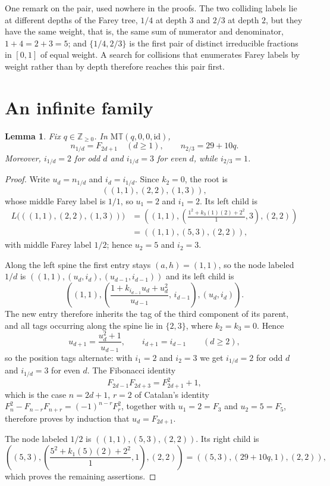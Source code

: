 \documentclass[11pt]{amsart}
\newtheorem{lemma}[theorem]{Lemma}
\newcommand{\GMT}{\mathrm{M}\mathbb{T}}
\newcommand{\id}{\mathrm{id}}
\begin{document}
One remark on the pair, used nowhere in the proofs. The two colliding labels lie
at different depths of the Farey tree, $1/4$ at depth $3$ and $2/3$ at depth
$2$, but they have the same weight, that is, the same sum of numerator and
denominator, $1+4=2+3=5$; and $\{1/4,2/3\}$ is the first pair of distinct
irreducible fractions in $[0,1]$ of equal weight. A search for collisions that
enumerates Farey labels by weight rather than by depth therefore reaches this
pair first.

\section{An infinite family}

\begin{lemma}\label{lem:spine}
Fix $q\in\mathbb Z_{\ge0}$. In $\GMT(q,0,0,\id)$,
\[
 n_{1/d}=F_{2d+1}\quad(d\ge1),
 \qquad
 n_{2/3}=29+10q.
\]
Moreover, $i_{1/d}=2$ for odd $d$ and $i_{1/d}=3$ for even $d$, while
$i_{2/3}=1$.
\end{lemma}

\begin{proof}
Write $u_d=n_{1/d}$ and $i_d=i_{1/d}$. Since $k_2=0$, the root is
\[
 ((1,1),(2,2),(1,3)),
\]
whose middle Farey label is $1/1$, so $u_1=2$ and $i_1=2$. Its left child
is
\begin{align*}
 L\bigl(((1,1),(2,2),(1,3))\bigr)
 &=\left((1,1),\left(\frac{1^2+k_3(1)(2)+2^2}{1},3\right),(2,2)\right)\\
 &=((1,1),(5,3),(2,2)),
\end{align*}
with middle Farey label $1/2$; hence $u_2=5$ and $i_2=3$.

Along the left spine the first entry stays $(a,h)=(1,1)$, so the node labeled
$1/d$ is $((1,1),(u_d,i_d),(u_{d-1},i_{d-1}))$ and its left child is
\[
 \left(
  (1,1),
  \left(\frac{1+k_{i_{d-1}}u_d+u_d^2}{u_{d-1}},\,i_{d-1}\right),
  (u_d,i_d)
 \right).
\]
The new entry therefore inherits the tag of the third component of its
parent, and all tags occurring along the spine lie in $\{2,3\}$, where
$k_2=k_3=0$. Hence
\[
 u_{d+1}=\frac{u_d^2+1}{u_{d-1}},
 \qquad
 i_{d+1}=i_{d-1}
 \qquad(d\ge2),
\]
so the position tags alternate: with $i_1=2$ and $i_2=3$ we get $i_{1/d}=2$
for odd $d$ and $i_{1/d}=3$ for even $d$. The Fibonacci identity
\[
 F_{2d-1}F_{2d+3}=F_{2d+1}^2+1,
\]
which is the case $n=2d+1$, $r=2$ of Catalan's identity
$F_n^2-F_{n-r}F_{n+r}=(-1)^{n-r}F_r^2$, together with
$u_1=2=F_3$ and $u_2=5=F_5$, therefore proves by induction that
$u_d=F_{2d+1}$.

The node labeled $1/2$ is $((1,1),(5,3),(2,2))$. Its right child is
\[
 \left((5,3),\left(\frac{5^2+k_1(5)(2)+2^2}{1},1\right),(2,2)\right)
 =((5,3),(29+10q,1),(2,2)),
\]
which proves the remaining assertions.
\end{proof}
\end{document}
